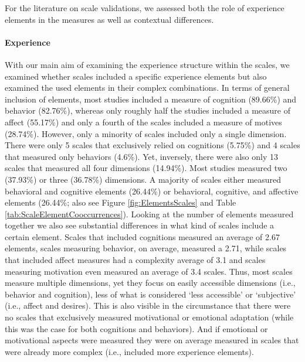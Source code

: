 For the literature on scale validations, we assessed both the role of
experience elements in the measures as well as contextual differences.

\paragraph{Experience}

With our main aim of examining the experience structure within the
scales, we examined whether scales included a specific experience
elements but also examined the used elements in their complex
combinations. In terms of general inclusion of elements, most studies
included a measure of cognition (89.66\%) and behavior (82.76\%),
whereas only roughly half the studies included a measure of affect
(55.17\%) and only a fourth of the scales included a measure of motives
(28.74\%). However, only a minority of scales included only a single
dimension. There were only 5 scales that exclusively relied on
cognitions (5.75\%) and 4 scales that measured only behaviors (4.6\%).
Yet, inversely, there were also only 13 scales that measured all four
dimensions (14.94\%). Most studies measured two (37.93\%) or three
(36.78\%) dimensions. A majority of scales either measured behavioral
and cognitive elements (26.44\%) or behavioral, cognitive, and affective
elements (26.44\%; also see Figure \ref{fig:ElementsScales} and Table
\ref{tab:ScaleElementCooccurrences}). Looking at the number of elements
measured together we also see substantial differences in what kind of
scales include a certain element. Scales that included cognitions
measured an average of 2.67 elements, scales measuring behavior, on
average, measured a 2.71, while scales that included affect measures had
a complexity average of 3.1 and scales measuring motivation even
measured an average of 3.4 scales. Thus, most scales measure multiple
dimensions, yet they focus on easily accessible dimensions (i.e.,
behavior and cognition), less of what is considered `less accessible' or
`subjective' (i.e., affect and desires). This is also visible in the
circumstance that there were no scales that exclusively measured
motivational or emotional adaptation (while this was the case for both
cognitions and behaviors). And if emotional or motivational aspects were
measured they were on average measured in scales that were already more
complex (i.e., included more experience elements).

